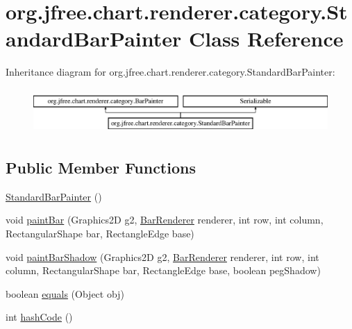 \hypertarget{classorg_1_1jfree_1_1chart_1_1renderer_1_1category_1_1_standard_bar_painter}{}\section{org.\+jfree.\+chart.\+renderer.\+category.\+Standard\+Bar\+Painter Class Reference}
\label{classorg_1_1jfree_1_1chart_1_1renderer_1_1category_1_1_standard_bar_painter}
Inheritance diagram for org.\+jfree.\+chart.\+renderer.\+category.\+Standard\+Bar\+Painter\+:\begin{figure}[H]
\begin{center}
\leavevmode
\includegraphics[height=1.723077cm]{classorg_1_1jfree_1_1chart_1_1renderer_1_1category_1_1_standard_bar_painter}
\end{center}
\end{figure}
\subsection*{Public Member Functions}
\begin{DoxyCompactItemize}
\item 
\mbox{\hyperlink{classorg_1_1jfree_1_1chart_1_1renderer_1_1category_1_1_standard_bar_painter_ab06adb03a5ffe9d33029d1a23fc8aa24}{Standard\+Bar\+Painter}} ()
\item 
void \mbox{\hyperlink{classorg_1_1jfree_1_1chart_1_1renderer_1_1category_1_1_standard_bar_painter_a9b7d0283e251003da72865b7986c2855}{paint\+Bar}} (Graphics2D g2, \mbox{\hyperlink{classorg_1_1jfree_1_1chart_1_1renderer_1_1category_1_1_bar_renderer}{Bar\+Renderer}} renderer, int row, int column, Rectangular\+Shape bar, Rectangle\+Edge base)
\item 
void \mbox{\hyperlink{classorg_1_1jfree_1_1chart_1_1renderer_1_1category_1_1_standard_bar_painter_a41cdf2e55cca272d470c7c87b9401376}{paint\+Bar\+Shadow}} (Graphics2D g2, \mbox{\hyperlink{classorg_1_1jfree_1_1chart_1_1renderer_1_1category_1_1_bar_renderer}{Bar\+Renderer}} renderer, int row, int column, Rectangular\+Shape bar, Rectangle\+Edge base, boolean peg\+Shadow)
\item 
boolean \mbox{\hyperlink{classorg_1_1jfree_1_1chart_1_1renderer_1_1category_1_1_standard_bar_painter_a7818bf9f210678b48b1c9b64b3323cd2}{equals}} (Object obj)
\item 
int \mbox{\hyperlink{classorg_1_1jfree_1_1chart_1_1renderer_1_1category_1_1_standard_bar_painter_af26d5c89487beb11783217064e0c16bd}{hash\+Code}} ()
\end{DoxyCompactItemize}


